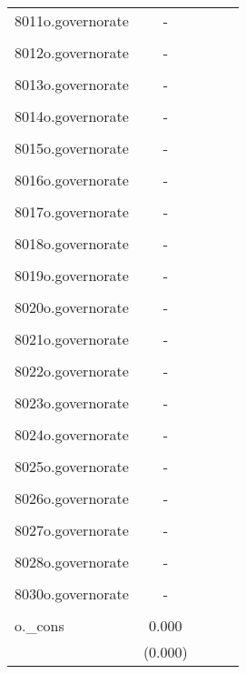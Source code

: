 \documentclass[]{article}
\begin{document}
\begin{tabular}{lcccc}
8011o.governorate & - &  &  &  \\
 &  &  &  &  \\
8012o.governorate & - &  &  &  \\
 &  &  &  &  \\
8013o.governorate & - &  &  &  \\
 &  &  &  &  \\
8014o.governorate & - &  &  &  \\
 &  &  &  &  \\
8015o.governorate & - &  &  &  \\
 &  &  &  &  \\
8016o.governorate & - &  &  &  \\
 &  &  &  &  \\
8017o.governorate & - &  &  &  \\
 &  &  &  &  \\
8018o.governorate & - &  &  &  \\
 &  &  &  &  \\
8019o.governorate & - &  &  &  \\
 &  &  &  &  \\
8020o.governorate & - &  &  &  \\
 &  &  &  &  \\
8021o.governorate & - &  &  &  \\
 &  &  &  &  \\
8022o.governorate & - &  &  &  \\
 &  &  &  &  \\
8023o.governorate & - &  &  &  \\
 &  &  &  &  \\
8024o.governorate & - &  &  &  \\
 &  &  &  &  \\
8025o.governorate & - &  &  &  \\
 &  &  &  &  \\
8026o.governorate & - &  &  &  \\
 &  &  &  &  \\
8027o.governorate & - &  &  &  \\
 &  &  &  &  \\
8028o.governorate & - &  &  &  \\
 &  &  &  &  \\
8030o.governorate & - &  &  &  \\
 &  &  &  &  \\
o.\_cons & 0.000 &  &  &  \\
 & (0.000) &  &  &  \\

\end{tabular}
\end{document}
